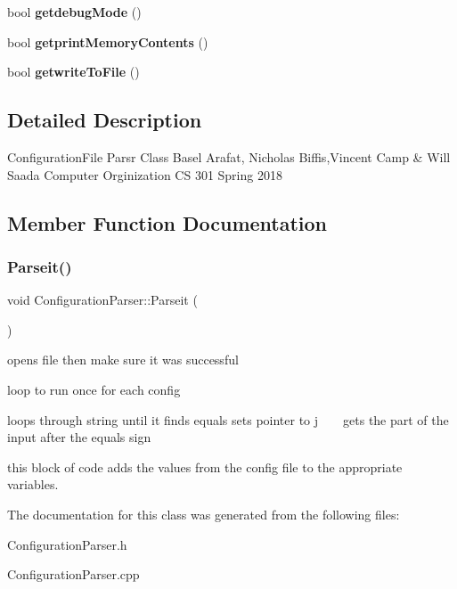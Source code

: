 \begin{DoxyCompactItemize}
\item 
\mbox{\label{class_configuration_parser_a95c47941501ecfa2f43162f6944f417c}} 
bool {\bfseries getdebug\+Mode} ()
\item 
\mbox{\label{class_configuration_parser_a02cc27ca0e27d39153f9d8a67480f2cc}} 
bool {\bfseries getprint\+Memory\+Contents} ()
\item 
\mbox{\label{class_configuration_parser_ac0b67ef67ad3987c3f24e36ded441a7c}} 
bool {\bfseries getwrite\+To\+File} ()
\end{DoxyCompactItemize}


\subsection{Detailed Description}
Configuration\+File Parsr Class Basel Arafat, Nicholas Biffis,Vincent Camp \& Will Saada Computer Orginization CS 301 Spring 2018 

\subsection{Member Function Documentation}
\mbox{\label{class_configuration_parser_ae1adbe510f3aa99d3f9c757a423f9a05}} 
\subsubsection{\texorpdfstring{Parseit()}{Parseit()}}
{\footnotesize\ttfamily void Configuration\+Parser\+::\+Parseit (\begin{DoxyParamCaption}{ }\end{DoxyParamCaption})}

opens file then make sure it was successful

loop to run once for each config

loops through string until it finds equals sets pointer to j ~\newline
~\newline
 gets the part of the input after the equals sign

this block of code adds the values from the config file to the appropriate variables. 

The documentation for this class was generated from the following files\+:\begin{DoxyCompactItemize}
\item 
Configuration\+Parser.\+h\item 
Configuration\+Parser.\+cpp\end{DoxyCompactItemize}
